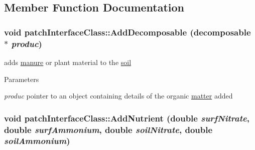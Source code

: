 \subsection{Member Function Documentation}
\hypertarget{classpatch_interface_class_a5477552c0a1821f3f40e0bb3c96c7f8a}{
\subsubsection[{AddDecomposable}]{\setlength{\rightskip}{0pt plus 5cm}void patchInterfaceClass::AddDecomposable ({\bf decomposable} $\ast$ {\em produc})}}
\label{classpatch_interface_class_a5477552c0a1821f3f40e0bb3c96c7f8a}


adds \hyperlink{classmanure}{manure} or plant material to the \hyperlink{classsoil}{soil} 
\begin{DoxyParams}{Parameters}
\item[{\em produc}]pointer to an object containing details of the organic \hyperlink{classmatter}{matter} added \end{DoxyParams}
\hypertarget{classpatch_interface_class_a9d183a51a7e9855ea13223c52b2ea3da}{
\subsubsection[{AddNutrient}]{\setlength{\rightskip}{0pt plus 5cm}void patchInterfaceClass::AddNutrient (double {\em surfNitrate}, \/  double {\em surfAmmonium}, \/  double {\em soilNitrate}, \/  double {\em soilAmmonium})}}
\label{classpatch_interface_class_a9d183a51a7e9855ea13223c52b2ea3da}


